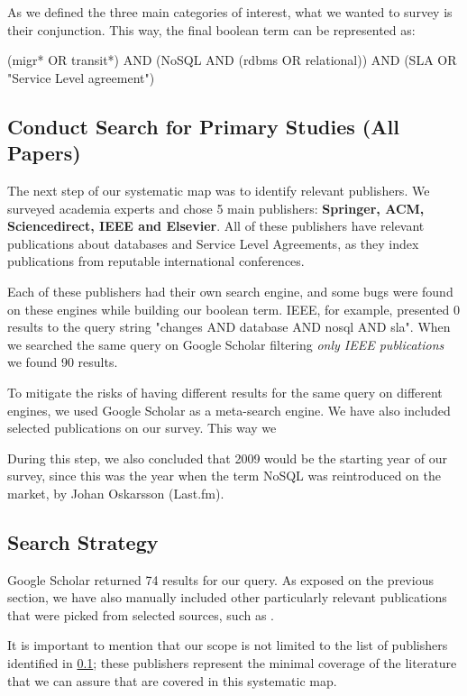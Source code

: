 \documentclass{article}
\begin{document}
As we defined the three main categories of interest, what we wanted to survey is their conjunction. This way, the final boolean term can be represented as: 

\begin{center}
(migr* OR transit*) AND (NoSQL AND (rdbms OR relational)) AND (SLA OR "Service Level agreement") 
\end{center}

\subsection{Conduct Search for Primary Studies (All Papers)}\label{sec:allPapers}

The next step of our systematic map was to identify relevant publishers. We surveyed academia experts and chose 5 main publishers: \textbf{Springer, ACM, Sciencedirect, IEEE and Elsevier}. All of these publishers have relevant publications about databases and Service Level Agreements, as they index publications from reputable international conferences.  

Each of these publishers had their own search engine, and some bugs were found on these engines while building our boolean term. IEEE, for example, presented 0 results to the query string "changes AND database AND nosql AND sla". When we searched the same query on Google Scholar filtering \textit{only IEEE publications} we found 90 results.   

To mitigate the risks of having different results for the same query on different engines, we used Google Scholar as a meta-search engine. We have also included selected publications on our survey. This way we 

During this step, we also concluded that 2009 would be the starting year of our survey, since this was the year when the term NoSQL was reintroduced on the market, by Johan Oskarsson (Last.fm)\cite{ericevans}.

\subsection{Search Strategy}\label{sec:searchStrategy}

Google Scholar returned 74 results for our query. As exposed on the previous section, we have also manually included other particularly relevant publications that were picked from selected sources, such as \cite{mastersthesrilinda}.

It is important to mention that our scope is not limited to the list of publishers identified in \ref{sec:allPapers}; these publishers represent the minimal coverage of the literature that we can assure that are covered in this systematic map.
\end{document}
